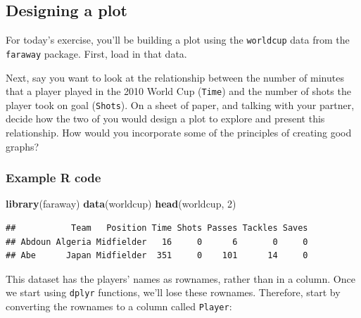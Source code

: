 \documentclass[]{book}
\makeatletter
\newenvironment{Shaded}{\begin{snugshade}}{\end{snugshade}}
\newcommand{\KeywordTok}[1]{\textcolor[rgb]{0.13,0.29,0.53}{\textbf{#1}}}
\newcommand{\DataTypeTok}[1]{\textcolor[rgb]{0.13,0.29,0.53}{#1}}
\newcommand{\DecValTok}[1]{\textcolor[rgb]{0.00,0.00,0.81}{#1}}
\newcommand{\StringTok}[1]{\textcolor[rgb]{0.31,0.60,0.02}{#1}}
\newcommand{\OperatorTok}[1]{\textcolor[rgb]{0.81,0.36,0.00}{\textbf{#1}}}
\newcommand{\NormalTok}[1]{#1}
\newenvironment{kframe}{%
\medskip{}
\setlength{\fboxsep}{.8em}
 \def\at@end@of@kframe{}%
 \ifinner\ifhmode%
  \def\at@end@of@kframe{\end{minipage}}%
  \begin{minipage}{\columnwidth}%
 \fi\fi%
 \def\FrameCommand##1{\hskip\@totalleftmargin \hskip-\fboxsep
 \colorbox{shadecolor}{##1}\hskip-\fboxsep
     \hskip-\linewidth \hskip-\@totalleftmargin \hskip\columnwidth}%
 \MakeFramed {\advance\hsize-\width
   \@totalleftmargin\z@ \linewidth\hsize
   \@setminipage}}%
 {\par\unskip\endMakeFramed%
 \at@end@of@kframe}
\renewenvironment{Shaded}{\begin{kframe}}{\end{kframe}}
\theoremstyle{definition}
\theoremstyle{definition}
\theoremstyle{definition}
\theoremstyle{remark}
\makeatother
\begin{document}
\subsection{Designing a plot}\label{designing-a-plot}

For today's exercise, you'll be building a plot using the
\texttt{worldcup} data from the \texttt{faraway} package. First, load in
that data.

Next, say you want to look at the relationship between the number of
minutes that a player played in the 2010 World Cup (\texttt{Time}) and
the number of shots the player took on goal (\texttt{Shots}). On a sheet
of paper, and talking with your partner, decide how the two of you would
design a plot to explore and present this relationship. How would you
incorporate some of the principles of creating good graphs?

\subsubsection{Example R code}\label{example-r-code-6}

\begin{Shaded}
\begin{Highlighting}[]
\KeywordTok{library}\NormalTok{(faraway)}
\KeywordTok{data}\NormalTok{(worldcup)}
\KeywordTok{head}\NormalTok{(worldcup, }\DecValTok{2}\NormalTok{)}
\end{Highlighting}
\end{Shaded}

\begin{verbatim}
##           Team   Position Time Shots Passes Tackles Saves
## Abdoun Algeria Midfielder   16     0      6       0     0
## Abe      Japan Midfielder  351     0    101      14     0
\end{verbatim}

This dataset has the players' names as rownames, rather than in a
column. Once we start using \texttt{dplyr} functions, we'll lose these
rownames. Therefore, start by converting the rownames to a column called
\texttt{Player}:

\begin{Shaded}
\end{Shaded}
\end{document}
